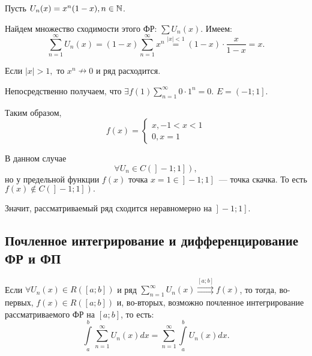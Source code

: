 \documentclass[../../main.tex]{subfiles}
\begin{document}
\begin{exmp}
	Пусть $U_n(x) = x^n(1 - x), n \in \mathbb{N}$.
	
	Найдем множество сходимости этого ФР: $\sum U_n(x)$. Имеем:
	\[
	\sum_{n = 1}^{\infty} U_n(x) = (1 - x)\sum_{n = 1}^{\infty} x^n \overset{|x| 
	< 1}{=} (1 - x) \cdot \frac{x}{1 - x} = x.
	\]
	
	Если $|x| > 1,$ то $x^n \nrightarrow 0$ и ряд расходится.
	
	Непосредственно получаем, что $\exists f(1) \sum\limits_{n = 1}^{\infty} 0 
	\cdot 1^n = 0.$
	$E = \left.\left(-1; 1\right.\right].$ 
	
	Таким образом, 
	\[
	f(x) =
	\begin{cases}
	x, -1 < x < 1 \\
	0, x = 1
	\end{cases}
	\]
	
	В данном случае \[\forall U_n \in C(\left.\left.\right] -1; 1 \right]),\] но 
	у предельной функции $f(x)$ точка $x = 1 \in \left.\left.\right] -1; 1 
	\right] $~--- точка скачка.	
	То есть 
	$f(x) \notin  C(\left.\left.\right] -1; 1 \right]).$ 
	
	Значит, рассматриваемый ряд сходится неравномерно на $\left.\left.\right] -1; 
	1 \right].$
\end{exmp}


\subsection{Почленное интегрирование и дифференцирование ФР и ФП}

\begin{thm}
	Если $\forall U_n(x) \in R([a; b])$  и ряд $\sum\limits_{n = 1}^{\infty} 
	U_n(x) \overset{[a; b]}{\rightrightarrows} f(x)$, то тогда, во-первых, $f(x) 
	\in R([a; b])$ и, во-вторых, возможно почленное интегрирование 
	рассматриваемого ФР на $[a; b]$, то есть:
	\begin{equation} \label{eq:19}
	\int\limits_{a}^{b} \sum\limits_{n = 1}^{\infty}  U_n(x) dx = \sum\limits_{n 
	= 1}^{\infty}  \int\limits_{a}^{b} U_n(x) dx.
	\end{equation}
	
\end{thm}
\end{document}
